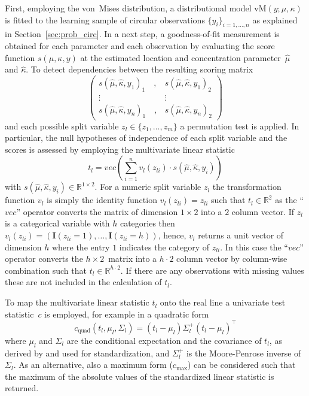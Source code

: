 \documentclass{statsoc}
\newcommand{\I}{\mathbf{I}}
\begin{document}
\begin{appendix}
First, employing the von~Mises distribution, a distributional model
$\text{vM}(y; \mu,\kappa)$ is fitted to the learning sample of circular
observations $\{y_i\}_{i = 1,\ldots,n}$ as explained in
Section~\ref{sec:prob_circ}. In a next step, a goodness-of-fit measurement is
obtained for each parameter and each observation by evaluating the score
function $s(\mu, \kappa, y)$ at the estimated location and concentration
parameter~$\hat{\mu}$ and $\hat{\kappa}$. To detect dependencies between the
resulting scoring matrix
\begin{equation}
\begin{pmatrix} 
s(\hat{\mu}, \hat{\kappa}, y_1)_1 \quad, & s(\hat{\mu}, \hat{\kappa}, y_1)_2\\
\vdots & \vdots\\
s(\hat{\mu}, \hat{\kappa}, y_n)_1 \quad,& s(\hat{\mu}, \hat{\kappa}, y_n)_2
\end{pmatrix}
\end{equation}
and each possible split variable $z_l \in \{z_1, \ldots, z_m\}$ a permutation
test is applied. In particular, the null hypotheses of independence of each
split variable and the scores is assessed by employing the multivariate linear
statistic
\begin{equation}
t_l = vec\left(\sum_{i=1}^n v_l(z_{li}) \cdot s(\hat{\mu}, \hat{\kappa}, y_i)\right)
\end{equation}
with $s(\hat{\mu}, \hat{\kappa}, y_i) \in \mathbb{R}^{1\times 2}$. For a
numeric split variable $z_l$ the transformation function $v_l$ is simply the
identity function $v_l(z_{li}) = z_{li}$ such that $t_l \in \mathbb{R}^2$ as
the ``$vec$'' operator converts the matrix of dimension $1 \times 2$ into a $2$
column vector. If $z_l$ is a categorical variable with $h$ categories then
$v_l(z_{li}) = (\I(z_{li} = 1), \ldots, \I(z_{li} = h))$, hence, $v_l$ returns
a unit vector of dimension $h$ where the entry $1$ indicates the category of
$z_{li}$. In this case the ``$vec$'' operator converts the $h \times 2$~matrix
into a $h \cdot 2$ column vector by column-wise combination such that $t_l \in
\mathbb{R}^{h \cdot 2}$. If there are any observations with missing values
these are not included in the calculation of $t_l$.

To map the multivariate linear statistic $t_l$ onto the real line a univariate
test statistic~$c$ is employed, for example in a quadratic form
\begin{equation}
c_{\text{quad}}(t_l,\mu_l,\Sigma_l) = (t_l-\mu_l)\Sigma_l^+(t_l-\mu_l)^{\top}
\end{equation}
where $\mu_l$ and $\Sigma_l$ are the conditional expectation and the covariance
of $t_l$, as derived by \cite{Strasser+Weber:1999} and used for
standardization, and $\Sigma_l^+$ is the Moore-Penrose inverse of $\Sigma_l$.
As an alternative, also a maximum form ($c_{\text{max}}$) can be considered
such that the maximum of the absolute values of the standardized linear
statistic is returned.


\end{appendix}
\end{document}
